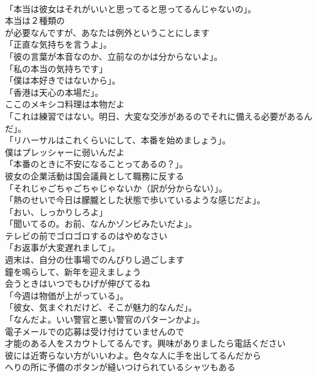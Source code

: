 \documentclass[8pt]{extreport}
\begin{document}
\begin{CJK}{UTF8}{min}
\\	「本当は彼女はそれがいいと思ってると思ってるんじゃないの」。	
\\	本当は２種類の
\\	が必要なんですが、あなたは例外ということにします	
\\	「正直な気持ちを言うよ」。	
\\	「彼の言葉が本音なのか、立前なのかは分からないよ」。	
\\	「私の本当の気持ちです」	
\\	「僕は本好きではないから」。	
\\	「香港は天心の本場だ」。	
\\	ここのメキシコ料理は本物だよ	
\\	「これは練習ではない。明日、大変な交渉があるのでそれに備える必要があるんだ」。	
\\	「リハーサルはこれくらいにして、本番を始めましょう」。	
\\	僕はプレッシャーに弱いんだよ	
\\	「本番のときに不安になることってあるの？」。	
\\	彼女の企業活動は国会議員として職務に反する	
\\	「それじゃごちゃごちゃじゃないか（訳が分からない）」。	
\\	「熱のせいで今日は朦朧とした状態で歩いているような感じだよ」。	
\\	「おい、しっかりしろよ」	
\\	「聞いてるの。お前、なんかゾンビみたいだよ」。	
\\	テレビの前でゴロゴロするのはやめなさい	
\\	「お返事が大変遅れまして」。	
\\	週末は、自分の仕事場でのんびりし過ごします	
\\	鐘を鳴らして、新年を迎えましょう	
\\	会うときはいつでもひげが伸びてるね	
\\	「今週は物価が上がっている」。	
\\	「彼女、気まぐれだけど、そこが魅力的なんだ」。	
\\	「なんだよ。いい警官と悪い警官のパターンかよ」。	
\\	電子メールでの応募は受け付けていませんので	
\\	才能のある人をスカウトしてるんです。興味がありましたら電話ください	
\\	彼には近寄らない方がいいわよ。色々な人に手を出してるんだから	
\\	へりの所に予備のボタンが縫いつけられているシャツもある	

\end{CJK}
\end{document}
